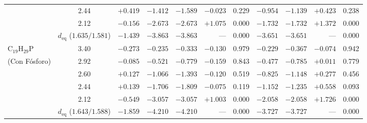 \documentclass[10pt,twocolumn,a4paper]{article}
\begin{document}
\begin{table}[t]
{\begin{tabular}{@{}lcrrrrrrrrr@{}}
 & 2.44 & $+0.419$ & $-1.412$ & $-1.589$ & $-0.023$ & 0.229 & $-0.954$ & $-1.139$ & $+0.423$ & 0.238 \\
 & 2.12 & $-0.156$ & $-2.673$ & $-2.673$ & $+1.075$ & 0.000 & $-1.732$ & $-1.732$ & $+1.372$ & 0.000 \\
 & $d_{\text{eq}}$ ($1.635 / 1.581$) & $-1.439$ & $-3.863$ & $-3.863$ & --- & 0.000 & $\mathbf{-3.651}$ & $\mathbf{-3.651}$ & --- & 0.000 \\ \midrule
$\text{C}_{19}\text{H}_{29}\text{P}$ & 3.40 & $-0.273$ & $-0.235$ & $-0.333$ & $-0.130$ & 0.979 & $-0.229$ & $-0.367$ & $-0.074$ & 0.942 \\
(Con Fósforo) & 2.92 & $-0.085$ & $-0.521$ & $-0.779$ & $-0.159$ & 0.843 & $-0.477$ & $-0.785$ & $+0.011$ & 0.779 \\
 & 2.60 & $+0.127$ & $-1.066$ & $-1.393$ & $-0.120$ & 0.519 & $-0.825$ & $-1.148$ & $+0.277$ & 0.456 \\
 & 2.44 & $+0.139$ & $-1.706$ & $-1.809$ & $-0.075$ & 0.119 & $-1.152$ & $-1.235$ & $+0.558$ & 0.093 \\
 & 2.12 & $-0.549$ & $-3.057$ & $-3.057$ & $+1.003$ & 0.000 & $-2.058$ & $-2.058$ & $+1.726$ & 0.000 \\
 & $d_{\text{eq}}$ ($1.643 / 1.588$) & $-1.859$ & $-4.210$ & $-4.210$ & --- & 0.000 & $\mathbf{-3.727}$ & $\mathbf{-3.727}$ & --- & 0.000 \\ \bottomrule
\end{tabular}%
}
\end{table}
\end{document}
